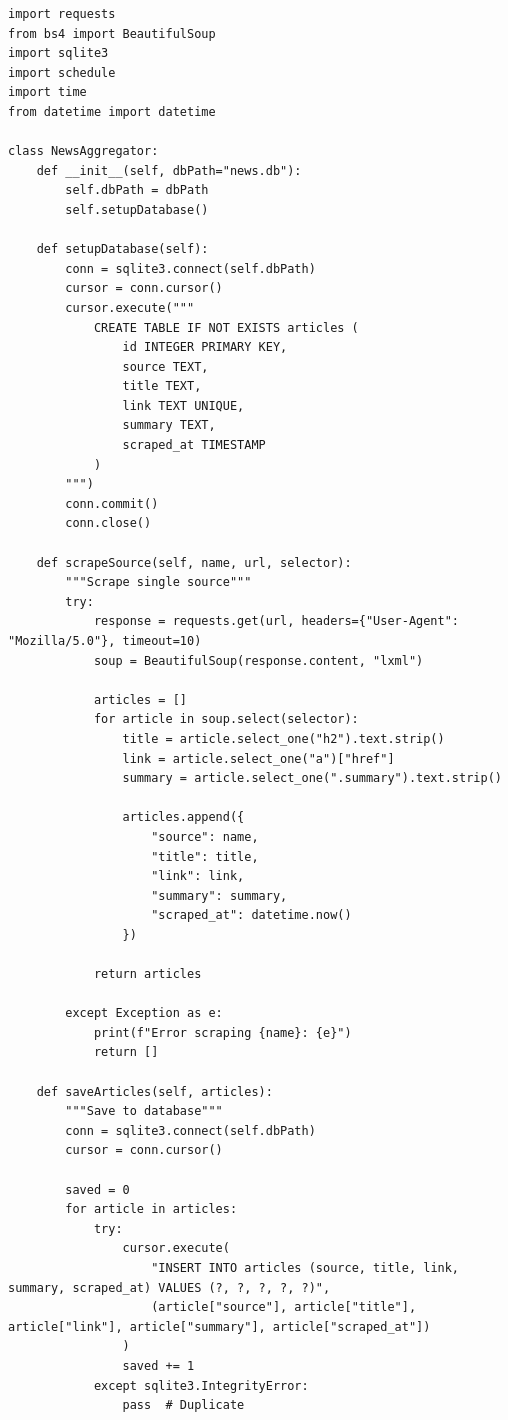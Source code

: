 \begin{lstlisting}
import requests
from bs4 import BeautifulSoup
import sqlite3
import schedule
import time
from datetime import datetime

class NewsAggregator:
    def __init__(self, dbPath="news.db"):
        self.dbPath = dbPath
        self.setupDatabase()

    def setupDatabase(self):
        conn = sqlite3.connect(self.dbPath)
        cursor = conn.cursor()
        cursor.execute("""
            CREATE TABLE IF NOT EXISTS articles (
                id INTEGER PRIMARY KEY,
                source TEXT,
                title TEXT,
                link TEXT UNIQUE,
                summary TEXT,
                scraped_at TIMESTAMP
            )
        """)
        conn.commit()
        conn.close()

    def scrapeSource(self, name, url, selector):
        """Scrape single source"""
        try:
            response = requests.get(url, headers={"User-Agent": "Mozilla/5.0"}, timeout=10)
            soup = BeautifulSoup(response.content, "lxml")

            articles = []
            for article in soup.select(selector):
                title = article.select_one("h2").text.strip()
                link = article.select_one("a")["href"]
                summary = article.select_one(".summary").text.strip()

                articles.append({
                    "source": name,
                    "title": title,
                    "link": link,
                    "summary": summary,
                    "scraped_at": datetime.now()
                })

            return articles

        except Exception as e:
            print(f"Error scraping {name}: {e}")
            return []

    def saveArticles(self, articles):
        """Save to database"""
        conn = sqlite3.connect(self.dbPath)
        cursor = conn.cursor()

        saved = 0
        for article in articles:
            try:
                cursor.execute(
                    "INSERT INTO articles (source, title, link, summary, scraped_at) VALUES (?, ?, ?, ?, ?)",
                    (article["source"], article["title"], article["link"], article["summary"], article["scraped_at"])
                )
                saved += 1
            except sqlite3.IntegrityError:
                pass  # Duplicate


\end{lstlisting}

